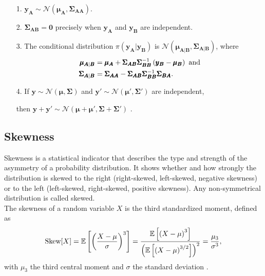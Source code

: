 \begin{itemize}
    \item[1.] $\pmb{y}_{\pmb{A}}\sim\mathcal{N}\left(\pmb{\mu}_{\pmb{A}}, \pmb{\Sigma}_{\pmb{AA}}\right)$.
    \item[2.] $\pmb{\Sigma}_{\pmb{AB}}=\pmb{0}$ precisely when $\pmb{y}_{\pmb{A}}$ and $\pmb{y}_{\pmb{B}}$ are independent.
    \item[3.] The conditional distribution $\pi\left(\pmb{y}_{\pmb{A}}|\pmb{y}_{\pmb{B}}\right)$ is $\mathcal{N}\left(\pmb{\mu}_{\pmb{A}|\pmb{B}}, \pmb{\Sigma}_{\pmb{A}|\pmb{B}}\right)$, where
    \begin{align*}
        \pmb{\mu}_{\pmb{A}|\pmb{B}} &= \pmb{\mu}_{\pmb{A}}+\pmb{\Sigma}_{\pmb{AB}}\pmb{\Sigma}_{\pmb{BB}}^{-1}\left(\pmb{y}_{\pmb{B}}-\pmb{\mu}_{\pmb{B}}\right) \hbox{ and} \\
        \pmb{\Sigma}_{\pmb{A}|\pmb{B}} &= \pmb{\Sigma}_{\pmb{AA}}-\pmb{\Sigma}_{\pmb{AB}}\pmb{\Sigma}_{\pmb{BB}}^{-1}\pmb{\Sigma}_{\pmb{BA}}.
    \end{align*}
    \item[4.] If $\pmb{y}\sim\mathcal{N}\left(\pmb{\mu}, \pmb{\Sigma}\right)$ and $\pmb{y}'\sim\mathcal{N}\left(\pmb{\mu'}, \pmb{\Sigma'}\right)$ are independent, 
    \item[]then $\pmb{y}+\pmb{y'}\sim\mathcal{N}\left(\pmb{\mu}+ \pmb{\mu'}, \pmb{\Sigma}+ \pmb{\Sigma'}\right)$ \autocite[][19--20]{rue2005gaussian}.
\end{itemize}
\subsection{Skewness}
Skewness is a statistical indicator that describes the type and strength of the asymmetry of a probability distribution. It shows whether and how strongly the distribution is skewed to the right (right-skewed, left-skewed, negative skewness) or to the left (left-skewed, right-skewed, positive skewness). Any non-symmetrical distribution is called skewed. \\
The skewness of a random variable $X$ is the third standardized moment, defined as
\begin{equation}\label{eq:skewness}
    \hbox{Skew}[X]=\mathbb{E}\left[\left(\frac{X-\mu}{\sigma}\right)^3\right] = \frac{\mathbb{E}\left[\left(X-\mu\right)^3\right]}{\left(\mathbb{E}\left[\left(X-\mu\right)^{3/2}\right]\right)^2}=\frac{\mu_3}{\sigma^3},
\end{equation}
with $\mu_3$ the third central moment and $\sigma$ the standard deviation \autocite[][]{doane2011measuring, wilkins1944note}.
